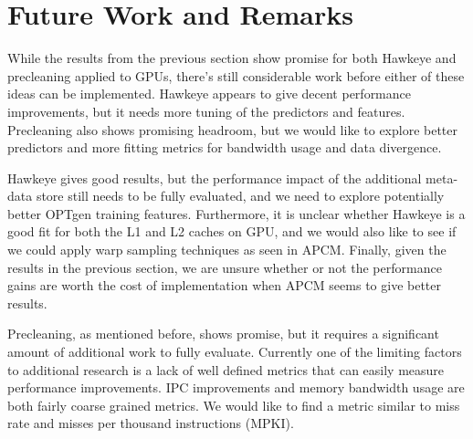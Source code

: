 \chapter{Future Work and Remarks}

While the results from the previous section show promise for both Hawkeye and precleaning applied to GPUs, there's still considerable work before either of these ideas can be implemented. Hawkeye appears to give decent performance improvements, but it needs more tuning of the predictors and features. Precleaning also shows promising headroom, but we would like to explore better predictors and more fitting metrics for bandwidth usage and data divergence.

Hawkeye gives good results, but the performance impact of the additional meta-data store still needs to be fully evaluated, and we need to explore potentially better OPTgen training features. Furthermore, it is unclear whether Hawkeye is a good fit for both the L1 and L2 caches on GPU, and we would also like to see if we could apply warp sampling techniques as seen in APCM. Finally, given the results in the previous section, we are unsure whether or not the performance gains are worth the cost of implementation when APCM seems to give better results.

Precleaning, as mentioned before, shows promise, but it requires a significant amount of additional work to fully evaluate. Currently one of the limiting factors to additional research is a lack of well defined metrics that can easily measure performance improvements. IPC improvements and memory bandwidth usage are both fairly coarse grained metrics. We would like to find a metric similar to miss rate and misses per thousand instructions (MPKI). 
